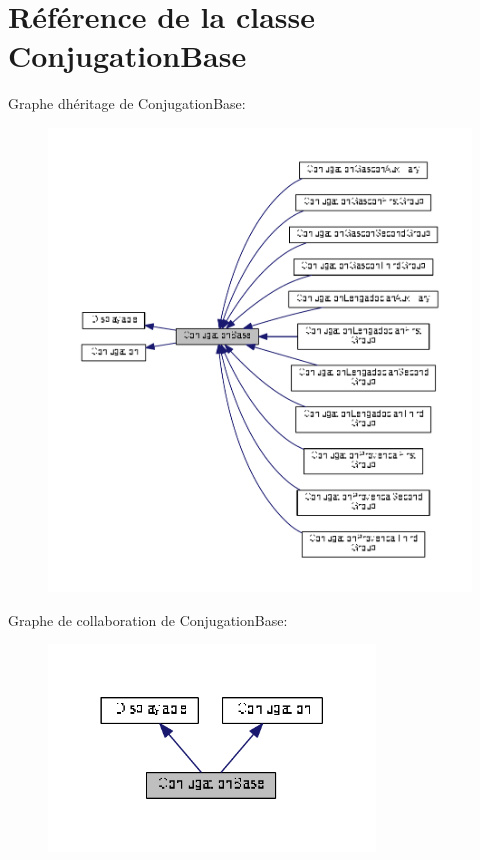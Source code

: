 \hypertarget{class_conjugation_base}{}\section{Référence de la classe Conjugation\+Base}
\label{class_conjugation_base}


Graphe d\textquotesingle{}héritage de Conjugation\+Base\+:
\nopagebreak
\begin{figure}[H]
\begin{center}
\leavevmode
\includegraphics[width=350pt]{class_conjugation_base__inherit__graph}
\end{center}
\end{figure}


Graphe de collaboration de Conjugation\+Base\+:
\nopagebreak
\begin{figure}[H]
\begin{center}
\leavevmode
\includegraphics[width=246pt]{class_conjugation_base__coll__graph}
\end{center}
\end{figure}
